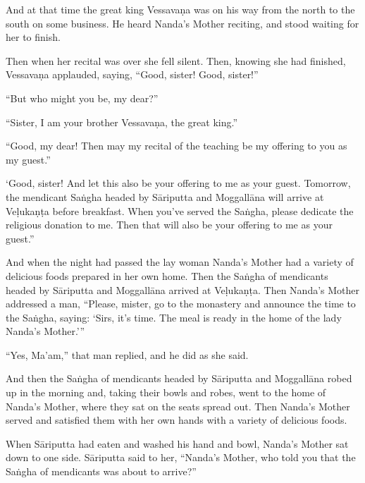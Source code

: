 \documentclass[12pt,openany]{book}%
\begin{document}
And at that time the great king \textsanskrit{Vessavaṇa} was on his way from the north to the south on some business. He heard Nanda’s Mother reciting, and stood waiting for her to finish. 

Then when her recital was over she fell silent. Then, knowing she had finished, \textsanskrit{Vessavaṇa} applauded, saying, “Good, sister! Good, sister!” 

“But who might you be, my dear?” 

“Sister, I am your brother \textsanskrit{Vessavaṇa}, the great king.” 

“Good, my dear! Then may my recital of the teaching be my offering to you as my guest.” 

‘Good, sister! And let this also be your offering to me as your guest. Tomorrow, the mendicant \textsanskrit{Saṅgha} headed by \textsanskrit{Sāriputta} and \textsanskrit{Moggallāna} will arrive at \textsanskrit{Veḷukaṇṭa} before breakfast. When you’ve served the \textsanskrit{Saṅgha}, please dedicate the religious donation to me. Then that will also be your offering to me as your guest.” 

And when the night had passed the lay woman Nanda’s Mother had a variety of delicious foods prepared in her own home. Then the \textsanskrit{Saṅgha} of mendicants headed by \textsanskrit{Sāriputta} and \textsanskrit{Moggallāna} arrived at \textsanskrit{Veḷukaṇṭa}. Then Nanda’s Mother addressed a man, “Please, mister, go to the monastery and announce the time to the \textsanskrit{Saṅgha}, saying: ‘Sirs, it’s time. The meal is ready in the home of the lady Nanda’s Mother.’” 

“Yes, Ma’am,” that man replied, and he did as she said. 

And then the \textsanskrit{Saṅgha} of mendicants headed by \textsanskrit{Sāriputta} and \textsanskrit{Moggallāna} robed up in the morning and, taking their bowls and robes, went to the home of Nanda’s Mother, where they sat on the seats spread out. Then Nanda’s Mother served and satisfied them with her own hands with a variety of delicious foods. 

When \textsanskrit{Sāriputta} had eaten and washed his hand and bowl, Nanda’s Mother sat down to one side. \textsanskrit{Sāriputta} said to her, “Nanda’s Mother, who told you that the \textsanskrit{Saṅgha} of mendicants was about to arrive?” 
\end{document}
